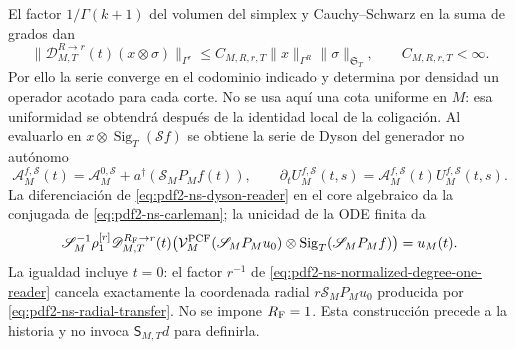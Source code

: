 El factor $1/\Gamma(k+1)$ del volumen del simplex y Cauchy--Schwarz en la
suma de grados dan
\begin{equation}\label{eq:pdf2-ns-dyson-bound}
 \|\mathscr D_{M,T}^{R\to r}(t)(x\otimes\sigma)\|_{\Gamma^r}
 \le C_{M,R,r,T}\|x\|_{\Gamma^R}\|\sigma\|_{\mathfrak S_T},
 \qquad C_{M,R,r,T}<\infty.
\end{equation}
Por ello la serie converge en el codominio indicado y determina por densidad
un operador acotado para cada corte. No se usa aquí una cota uniforme en $M$:
esa uniformidad se obtendrá después de la identidad local de la coligación.
Al evaluarlo en
$x\otimes\operatorname{Sig}_T(\mathscr Sf)$ se obtiene la serie de Dyson del generador no
autónomo
\begin{equation}\label{eq:pdf2-ns-nonautonomous-generator}
 \mathcal A_M^{f,\mathscr S}(t)
 =\mathcal A_M^{0,\mathscr S}+a^\dagger(\mathscr S_MP_Mf(t)),
 \qquad
 \partial_tU_M^{f,\mathscr S}(t,s)
 =\mathcal A_M^{f,\mathscr S}(t)U_M^{f,\mathscr S}(t,s).
\end{equation}
La diferenciación de \eqref{eq:pdf2-ns-dyson-reader} en el core algebraico da
la conjugada de \eqref{eq:pdf2-ns-carleman}; la unicidad de la ODE finita da
\begin{equation}\label{eq:pdf2-ns-dyson-degree-one}
 \mathscr S_M^{-1}\rho^{[r]}_1
 \mathscr D_{M,T}^{R_{\rm F}\to r}(t)
 \bigl(\mathcal V_M^{\rm PCF}(\mathscr S_MP_Mu_0)
       \otimes\operatorname{Sig}_T(\mathscr S_MP_Mf)\bigr)
 =u_M(t).
\end{equation}
La igualdad incluye $t=0$: el factor $r^{-1}$ de
\eqref{eq:pdf2-ns-normalized-degree-one-reader} cancela exactamente la
coordenada radial $r\mathscr S_MP_Mu_0$ producida por
\eqref{eq:pdf2-ns-radial-transfer}. No se impone $R_{\rm F}=1$.
Esta construcción precede a la historia y no invoca
$\mathsf S_{M,T}d$ para definirla.

